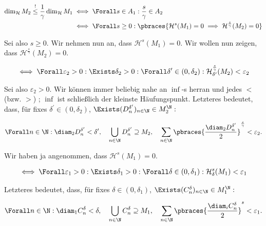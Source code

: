 \begin{solution}
\begin{align*}
    \dim_\mathcal{H} M_2
    \stackrel{!}{\leq}
    \frac{1}{\gamma}
    \dim_\mathcal{H} M_1
    & \iff
    \Forall s \in A_1:
        \frac{s}{\gamma} \in A_2 \\
    & \iff
    \Forall s \geq 0:
        \pbraces
        {
            \mathcal{H}^s(M_1) = 0
            \implies
            \mathcal{H}^\frac{s}{\gamma}(M_2) = 0
        }
\end{align*}

Sei also $s \geq 0$.
Wir nehmen nun an, dass $\mathcal{H}^s(M_1) = 0$.
Wir wollen nun zeigen, dass $\mathcal{H}^\frac{s}{\gamma}(M_2) = 0$.

\begin{align*}
    \iff
    \Forall \varepsilon_2 > 0:
    \Exists \delta_2 > 0:
    \Forall \delta^\prime \in (0, \delta_2):
        \mathcal{H}_{\delta^\prime}^\frac{s}{\gamma}(M_2) < \varepsilon_2
\end{align*}

Sei also $\varepsilon_2 > 0$.
Wir können immer beliebig nahe an $\inf$-s herran und jedes $<$ (bzw. $>$) ; $\inf$ ist schließlich der kleinste Häufungspunkt.
Letzteres bedeutet, dass, für fixes $\delta^\prime \in (0, \delta_2)$, $\Exists (D_n^{\delta^\prime})_{n \in \N} \in M_2^\N:$

\begin{align*}
    \Forall n \in \N:
        \diam_2 D_n^{\delta^\prime} < \delta^\prime,
    \quad
    \bigcup_{n \in \N}
        D_n^{\delta^\prime} \supseteq M_2,
    \quad
    \sum_{n \in \N}
        \pbraces
        {
            \frac{\diam_2 D_n^{\delta^\prime}}{2}
        }^\frac{s}{\gamma}
        <
        \varepsilon_2.
\end{align*}

Wir haben ja angenommen, dass $\mathcal{H}^s(M_1) = 0$.

\begin{align*}    
    \iff
    \Forall \varepsilon_1 > 0:
    \Exists \delta_1 > 0:
    \Forall \delta \in (0, \delta_1):
    \mathcal{H}_\delta^s(M_1) < \varepsilon_1
\end{align*}

Letzteres bedeutet, dass, für fixes $\delta \in (0, \delta_1)$, $\Exists (C_n^\delta)_{n \in \N} \in M_1^\N:$

\begin{align*}
    \Forall n \in \N:
        \diam_1 C_n^\delta < \delta,
    \quad
    \bigcup_{n \in \N} C_n^\delta \supseteq M_1,
    \quad
    \sum_{n \in \N} \pbraces{\frac{\diam_i C_n^\delta}{2}}^s < \varepsilon_1.
\end{align*}


\end{solution}
